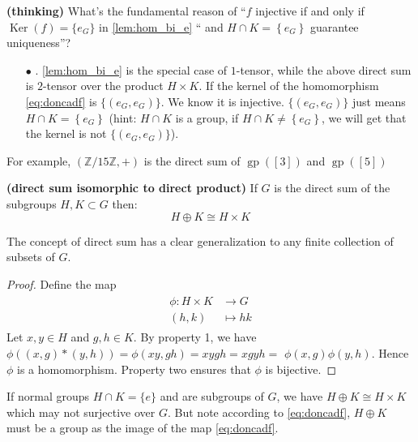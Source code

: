 \documentclass{article}
\newcommand{\bfs}[1]{\textbf{({#1}) }}
\newcommand{\gp}{\operatorname{gp}}
\newcommand{\Ker}{\operatorname{Ker}}
\begin{document}
\begin{rema}{\bfs{thinking}}\label{rem:dfgv}
 What's the  fundamental reason of ``$f$ injective if and only if $\Ker(f)=\{e_G\}$ in  \cref{lem:hom_bi_e} `` and  $H \cap K=\left\{e_{G}\right\}$  guarantee uniqueness''?
    \begin{enumerate}
        \item[$\bullet$] .  \cref{lem:hom_bi_e}  is the special case of $1$-tensor, while the above direct sum is $2$-tensor over the product $H\times K$. If the kernel of the homomorphism \cref{eq:doncadf} is $\{(e_G,e_G)\}$. We know it is injective. $\{(e_{G},e_{G})\}$ just means $H \cap K=\left\{e_{G}\right\}$ (hint: $H \cap K$ is a group, if $H \cap K\ne \left\{e_{G}\right\}$, we will get that  the kernel is not $\{(e_{G},e_{G})\}$).
    \end{enumerate}
\end{rema}
\begin{exma}
For example, $(\mathbb{Z} / 15 \mathbb{Z},+)$ is the direct sum of $\gp([3])$ and $\gp([5])$
\end{exma}

\begin{thma}{\bfs{direct sum isomorphic to direct product}}
 If $G$ is the direct sum of the subgroups $H, K \subset G$ then:
 $$H \oplus K \cong H \times K$$
\end{thma}
\begin{rema}
The concept of direct sum has a clear generalization to any finite collection of subsets of $G$.
\end{rema}
\begin{proof}
Define the map
\begin{align}
\begin{aligned}\label{eq:doncadf}
\phi: H \times K & \rightarrow G \\
(h, k) & \mapsto h k
\end{aligned}
\end{align}
Let $x, y \in H$ and $g, h \in K .$ By property 1, we have $\phi((x, g)*(y, h))=\phi(x y, g h)=x y g h=x g y h=$ $\phi(x, g) \phi(y, h) .$ Hence $\phi$ is a homomorphism. Property two ensures that $\phi$ is bijective.%
\end{proof} 
\begin{cora}
If normal groups $H\cap K=\{e\}$ and are subgroups of $G$, we have  $H \oplus K \cong H \times K$ which may not surjective over $G$. But note according to \cref{eq:doncadf}, $H \oplus K$ must be a group as the image of the map \cref{eq:doncadf}.
\end{cora}
\end{document}
